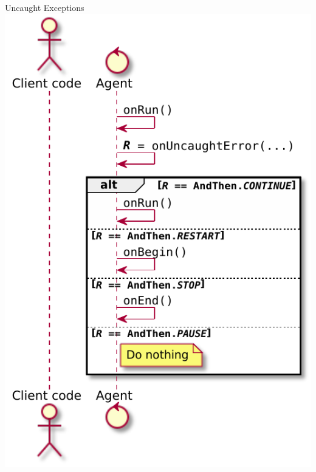 \documentclass[presentation]{beamer}\mode<presentation>{\usetheme{AMSCesenaPurpleAndGold}}
\begin{document}
\begin{frame}{Uncaught Exceptions}
    \includegraphics[height=.8\textheight]{img/exceptional-flow-2.pdf}
\end{frame}
\end{document}
